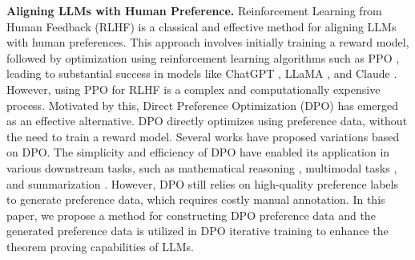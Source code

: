 \textbf{Aligning LLMs with Human Preference.} %
Reinforcement Learning from Human Feedback (RLHF) \cite{christiano2017RLHF} is a classical and effective method for aligning LLMs with human preferences. This approach involves initially training a reward model, followed by optimization using reinforcement learning algorithms such as 
PPO \cite{schulman2017PPO}, 
leading to substantial success in models like 
ChatGPT %
\cite{radford2019lGPT,brown2020GPT,achiam2023gpt}, %
LLaMA \cite{touvron2023llama,dubey2024llama}, 
and Claude \cite{bai2022training}. 
However, using PPO for RLHF is a complex and computationally expensive process. Motivated by this, Direct Preference Optimization (DPO) \cite{dpo2024} has emerged as an effective alternative. 
DPO directly optimizes using preference data, without the need to train a reward model. 
Several works \cite{ethayarajh2024kto,hong2024orpo,lai2024stepdpo,xu2024contrastive,zeng2024token,azar2024dpo_variant}  %
have proposed variations based on DPO. 
The simplicity and efficiency of DPO have enabled its application in various downstream tasks, such as 
mathematical reasoning \cite{xu2024chatglm,jiao2024learning,lu2024step-controlled-dpo}, %
multimodal tasks \cite{majumder2024tango}, 
and 
summarization \cite{dpo2024}.  %
However, DPO still relies on high-quality preference labels to generate preference data, which requires costly manual annotation. 
In this paper, we propose a method for constructing DPO preference data and 
the generated preference data is utilized in DPO iterative training to enhance the theorem proving capabilities of LLMs.



